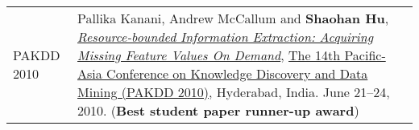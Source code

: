 \begin{longtabu}{p{.51\sectionwidth} p{.78\resumewidth}}
{\sc PAKDD 2010}\hypertarget{kanani2010pakdd}{} &
Pallika Kanani, Andrew McCallum and \textbf{Shaohan Hu},
\href{http://www.springerlink.com/content/j41w758434321108}{\emph{Resource-bounded Information Extraction: Acquiring Missing Feature Values On Demand}},
\href{http://www.iiit.ac.in/conferences/pakdd2010}{\textsf{The 14th Pacific-Asia Conference on Knowledge Discovery and Data Mining (PAKDD 2010)}},
Hyderabad, India. June 21--24, 2010. (\textbf{Best student paper runner-up award}) \\

\end{longtabu}
